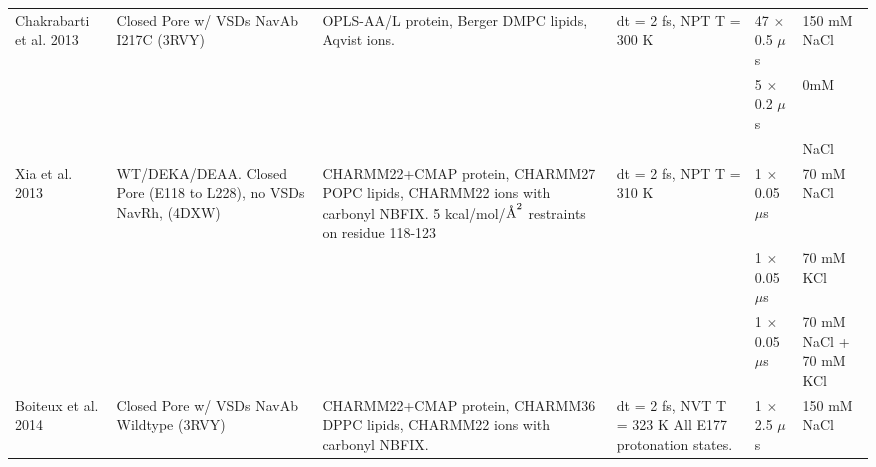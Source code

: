 \begin{refsection}
\begin{table}[]
\begin{threeparttable}
\begin{tabular}{ | p{1.5cm} | p{2.5cm} | p{3cm} | p{3cm} | p{2cm} | p{1cm} |}
Chakrabarti et al. 2013  & Closed Pore w/ VSDs  NavAb I217C (3RVY)\tnote{1}                                                      & OPLS-AA/L protein,\tnote{k} Berger DMPC lipids,\tnote{h} Aqvist ions.\tnote{l}                                                                                                & dt = 2 fs, NPT T = 300 K                                       & 47 $\times$ 0.5 $\mu$s               & 150 mM NaCl               \\
                         &                                       &                                                                                                                                                       &                                                                & 5 $\times$ 0.2 $\mu$s                & 0mM                       \\
                         &                                                                   &                                                                                                                                                       &                                                                &                           & NaCl                      \\
Xia et al. 2013          & WT/DEKA/DEAA. Closed Pore (E118 to L228), no VSDs  NavRh, (4DXW)\tnote{2} & CHARMM22+CMAP protein,\tnote{a} CHARMM27 POPC lipids,\tnote{b} CHARMM22 ions with carbonyl NBFIX.\tnote{d,e}   5 kcal/mol/$\textup{\AA}^{2}$ restraints on residue 118-123 & dt = 2 fs, NPT T = 310 K                                       & 1 $\times$ 0.05 $\mu$s               & 70 mM NaCl                \\
                         &                                                                   &                                                                                                                                                       &                                                                & 1 $\times$ 0.05 $\mu$s               & 70 mM KCl                 \\
                         &                                                                   &                                                                                                                                                       &                                                                & 1 $\times$ 0.05 $\mu$s               & 70 mM NaCl + 70 mM KCl    \\
Boiteux et al. 2014      & Closed Pore w/ VSDs  NavAb Wildtype (3RVY)\tnote{1}                                                      & CHARMM22+CMAP protein,\tnote{a} CHARMM36 DPPC lipids,\tnote{c} CHARMM22 ions with carbonyl NBFIX.\tnote{d,e}                                                                 & dt = 2 fs, NVT T = 323 K  All E177 protonation states.         & 1 $\times$ 2.5 $\mu$s                & 150 mM NaCl               \\

\end{tabular}
\end{threeparttable}
\end{table}
\end{refsection}
